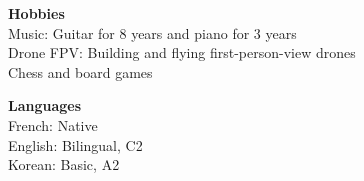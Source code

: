 \documentclass[letterpaper,11pt]{article}
\begin{document}
\begin{minipage}[t]{0.48\textwidth}
 \begin{itemize}[leftmargin=0in, label={}]
    \small{\item{
     \textbf{Hobbies} \vspace{2pt} \\
     Music: Guitar for 8 years and piano for 3 years \\
     Drone FPV: Building and flying first-person-view drones \\
     Chess and board games
    }}
 \end{itemize}
\end{minipage}
\hfill
\begin{minipage}[t]{0.48\textwidth}
 \begin{itemize}[leftmargin=0in, label={}]
    \small{\item{
     \textbf{Languages} \vspace{2pt} \\
     French: Native \\
     English: Bilingual, C2 \\
     Korean: Basic, A2
    }}
 \end{itemize}
\end{minipage}

\end{document}
